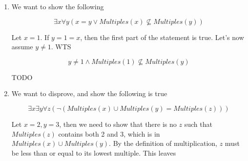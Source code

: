\documentclass{article}
\newcommand{\mult}{\textit{Multiples}}
\begin{document}
\begin{enumerate}
\begin{enumerate}
		      \item We want to show the following

		            $$
			            \exists x \forall y (x = y \lor \textit{Multiples}(x)
			            \not\subseteq \textit{Multiples}(y))
		            $$

		            Let $x = 1$. If $y = 1 = x$, then the first part of the statement is true. Let's
		            now assume $y \ne 1$. WTS

		            $$
			            y \ne 1 \land
			            \textit{Multiples}(1)
			            \not\subseteq \textit{Multiples}(y)
		            $$

		            TODO

		      \item We want to disprove, and show the following is true

		            $$
			            \exists x \exists y \forall z (\lnot (\mult(x) \cup \mult(y) = \mult(z)))
		            $$

					Let $x=2, y=3$, then we need to show that there is no $z$ such that $\mult(z)$
					contains both 2 and 3, which is in $\mult(x) \cup \mult(y)$. By the definition
					of multiplication, $z$ must be less than or equal to its lowest multiple. This leaves


	      \end{enumerate}
\end{enumerate}
\end{document}

